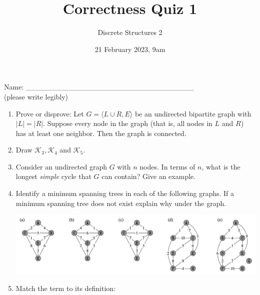 \documentclass[11pt, oneside]{article}   	%
\title{Correctness Quiz 1}
\author{Discrete Structures 2}
\date{21 February 2023, 9am}							%
\begin{document}
\maketitle
\begin{center}
Name: \_\_\_\_\_\_\_\_\_\_\_\_\_\_\_\_\_\_\_\_\_\_\_\_\_\_\_\_\_\_\_\_ \\(please write legibly) 
\end{center}

\begin{enumerate}


\item Prove or disprove: 
Let $G=\langle L\cup R,E\rangle$ be an undirected bipartite graph with $|L|=|R|$. 
Suppose every node in the graph (that is, all nodes in $L$ and $R$) has at least one neighbor. 
Then the graph is connected. 
\vspace{10em}

\item Draw $\mathcal{K}_3, \mathcal{K}_4$ and $\mathcal{K}_5$. 
\vspace{15em}

\item Consider an undirected graph $G$ with $n$ nodes.
In terms of $n$, what is the longest \emph{simple} cycle that $G$ can contain? 
Give an example. 
\vspace{15em}

\item Identify a minimum spanning trees in each of the following graphs. 
If a minimum spanning tree does not exist explain why under the graph.
\begin{center}
\hspace{-3em}\includegraphics[width=\textwidth]{DS2-CH11-MST}
\end{center}

\item Match the term to its definition: 


\end{enumerate}
\end{document}

